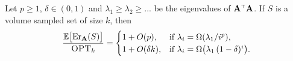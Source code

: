 \documentclass{article}
\begin{document}
%
%	
%
%	 		
%	 		
%	 		
%	 		
%	 	 
%

\begin{theorem}\label{t:upperbounds_withdecay}
	Let $p\geq 1$, $\delta\in(0,1)$ and $\lambda_1\!\geq\!\lambda_2\!\geq\!...$ be the eigenvalues of
	$\A^\top\A$.
	If $S$ is  a volume sampled set of size $k$, then
	\begin{align*}
	\frac{\mathbb E\big[\mathrm{Er}_\mathbf A(S)\big]}{{\textsc{OPT}_k}} =
	\begin{cases}
	1+O(p),&\text{if
	}\lambda_i=\Omega(\lambda_1/i^p),\\
	1+O(\delta k), &\text{if }\lambda_i=\Omega\big(\lambda_1\,(1-\delta)^i\big).
	\end{cases}
	\end{align*}
\end{theorem}
\end{document}

